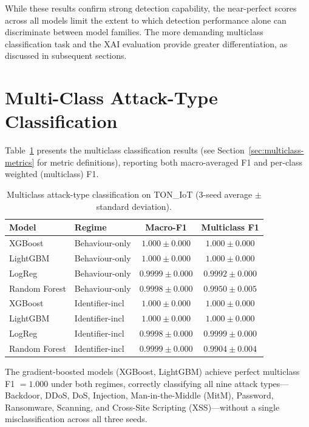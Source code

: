 \documentclass[12pt,a4paper]{report}
\begin{document}
While these results confirm strong detection capability, the near-perfect scores across all models limit the extent to which detection performance alone can discriminate between model families. The more demanding multiclass classification task and the XAI evaluation provide greater differentiation, as discussed in subsequent sections.

\section{Multi-Class Attack-Type Classification}
\label{sec:multiclass-results}

Table~\ref{tab:multiclass} presents the multiclass classification results (see Section~\ref{sec:multiclass-metrics} for metric definitions), reporting both macro-averaged F1 and per-class weighted (multiclass) F1.

\begin{table}[H]
\centering
\caption{Multiclass attack-type classification on TON\_IoT (3-seed average $\pm$ standard deviation).}
\label{tab:multiclass}
\begin{tabular}{llcc}
\toprule
\textbf{Model} & \textbf{Regime} & \textbf{Macro-F1} & \textbf{Multiclass F1} \\
\midrule
XGBoost & Behaviour-only & $1.000 \pm 0.000$ & $1.000 \pm 0.000$ \\
LightGBM & Behaviour-only & $1.000 \pm 0.000$ & $1.000 \pm 0.000$ \\
LogReg & Behaviour-only & $0.9999 \pm 0.000$ & $0.9992 \pm 0.000$ \\
Random Forest & Behaviour-only & $0.9998 \pm 0.000$ & $0.9950 \pm 0.005$ \\
\midrule
XGBoost & Identifier-incl & $1.000 \pm 0.000$ & $1.000 \pm 0.000$ \\
LightGBM & Identifier-incl & $1.000 \pm 0.000$ & $1.000 \pm 0.000$ \\
LogReg & Identifier-incl & $0.9998 \pm 0.000$ & $0.9999 \pm 0.000$ \\
Random Forest & Identifier-incl & $0.9999 \pm 0.000$ & $0.9904 \pm 0.004$ \\
\bottomrule
\end{tabular}
\end{table}

The gradient-boosted models (XGBoost, LightGBM) achieve perfect multiclass F1 $= 1.000$ under both regimes, correctly classifying all nine attack types---Backdoor, DDoS, DoS, Injection, Man-in-the-Middle (MitM), Password, Ransomware, Scanning, and Cross-Site Scripting (XSS)---without a single misclassification across all three seeds.
\end{document}
